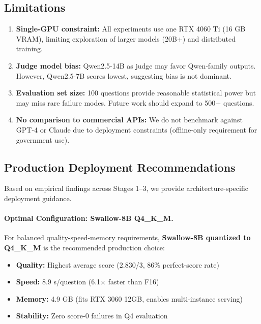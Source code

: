 \documentclass[twocolumn]{article}
\begin{document}
\subsection{Limitations}

\begin{enumerate}
  \item \textbf{Single-GPU constraint:} All experiments use one RTX 4060 Ti (16 GB VRAM),
        limiting exploration of larger models (20B+) and distributed training.
  \item \textbf{Judge model bias:} Qwen2.5-14B as judge may favor Qwen-family outputs.
        However, Qwen2.5-7B scores lowest, suggesting bias is not dominant.
  \item \textbf{Evaluation set size:} 100 questions provide reasonable statistical power
        but may miss rare failure modes. Future work should expand to 500+ questions.
  \item \textbf{No comparison to commercial APIs:} We do not benchmark against GPT-4 or
        Claude due to deployment constraints (offline-only requirement for government use).
\end{enumerate}

\subsection{Production Deployment Recommendations}

Based on empirical findings across Stages 1--3, we provide architecture-specific
deployment guidance.

\paragraph{Optimal Configuration: Swallow-8B Q4\_K\_M.}
For balanced quality-speed-memory requirements, \textbf{Swallow-8B quantized to Q4\_K\_M}
is the recommended production choice:
\begin{itemize}
  \item \textbf{Quality:} Highest average score (2.830/3, 86\% perfect-score rate)
  \item \textbf{Speed:} 8.9 s/question (6.1$\times$ faster than F16)
  \item \textbf{Memory:} 4.9 GB (fits RTX 3060 12GB, enables multi-instance serving)
  \item \textbf{Stability:} Zero score-0 failures in Q4 evaluation
\end{itemize}
\end{document}
